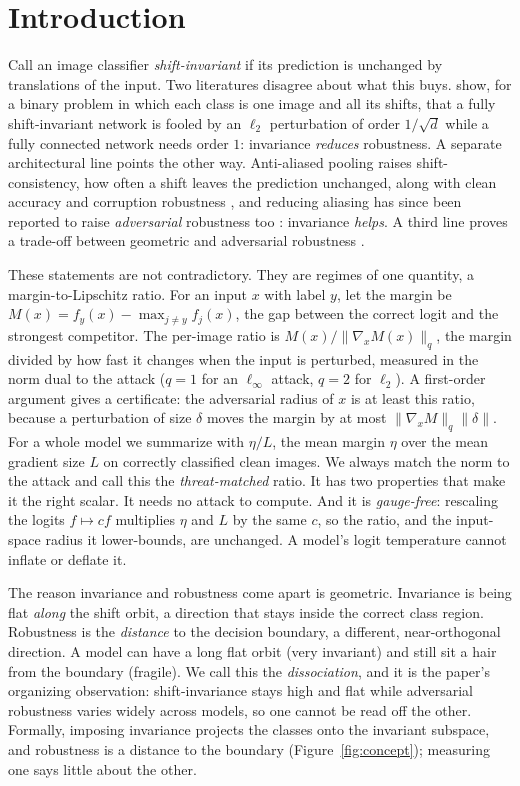\documentclass{article}
\theoremstyle{definition}
\newcommand{\dd}{d}
\newcommand{\etaL}{\eta/L}
\newcommand{\grad}{\nabla}
\begin{document}
\section{Introduction}\label{sec:intro}
Call an image classifier \emph{shift-invariant} if its prediction is unchanged by translations of the
input. Two literatures disagree about what this buys. \citet{ge2021shift} show, for a binary problem in
which each class is one image and all its shifts, that a fully shift-invariant network is fooled by an
$\ell_2$ perturbation of order $1/\sqrt\dd$ while a fully connected network needs order $1$: invariance
\emph{reduces} robustness. A separate architectural line points the other way. Anti-aliased pooling
raises shift-consistency, how often a shift leaves the prediction unchanged, along with clean accuracy
and corruption robustness \citep{zhang2019making}, and reducing aliasing has since been reported to
raise \emph{adversarial} robustness too \citep{grabinski2022aliasing,saha2024improving}: invariance
\emph{helps}. A third line proves a trade-off between geometric and adversarial robustness
\citep{kamath2021canwehaveitall,tramer2019multiple}.

These statements are not contradictory. They are regimes of one quantity, a margin-to-Lipschitz ratio.
For an input $x$ with label $y$, let the margin be $M(x)=f_y(x)-\max_{j\neq y}f_j(x)$, the gap between
the correct logit and the strongest competitor. The per-image ratio is
$M(x)/\lVert\grad_x M(x)\rVert_q$, the margin divided by how fast it changes when the input is perturbed,
measured in the norm dual to the attack ($q{=}1$ for an $\ell_\infty$ attack, $q{=}2$ for $\ell_2$). A
first-order argument gives a certificate: the adversarial radius of $x$ is at least this ratio, because
a perturbation of size $\delta$ moves the margin by at most $\lVert\grad_x M\rVert_q\lVert\delta\rVert$.
For a whole model we summarize with $\etaL$, the mean margin $\eta$ over the mean gradient size $L$ on
correctly classified clean images. We always match the norm to the attack and call this the
\emph{threat-matched} ratio. It has two properties that make it the right scalar. It needs no attack to
compute. And it is \emph{gauge-free}: rescaling the logits $f\mapsto cf$ multiplies $\eta$ and $L$ by
the same $c$, so the ratio, and the input-space radius it lower-bounds, are unchanged. A model's logit
temperature cannot inflate or deflate it.

The reason invariance and robustness come apart is geometric. Invariance is being flat \emph{along} the
shift orbit, a direction that stays inside the correct class region. Robustness is the \emph{distance} to
the decision boundary, a different, near-orthogonal direction. A model can have a long flat orbit (very
invariant) and still sit a hair from the boundary (fragile). We call this the \emph{dissociation}, and it
is the paper's organizing observation: shift-invariance stays high and flat while adversarial robustness
varies widely across models, so one cannot be read off the other. Formally, imposing invariance projects
the classes onto the invariant subspace, and robustness is a distance to the boundary
(Figure~\ref{fig:concept}); measuring one says little about the other.
\end{document}
